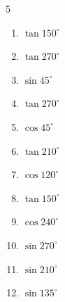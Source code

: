 \begin{multicols}{5}
\begin{enumerate}
  \item $\displaystyle \tan{150^\circ}$


\columnbreak %

\resetques

  \item $\displaystyle \tan{270^\circ}$

        \phantom{$\displaystyle なし$}

  \item $\displaystyle \sin{45^\circ}$


  \item $\displaystyle \tan{270^\circ}$

        \phantom{$\displaystyle なし$}

  \item $\displaystyle \cos{45^\circ}$


  \item $\displaystyle \tan{210^\circ}$


  \item $\displaystyle \cos{120^\circ}$


  \item $\displaystyle \tan{150^\circ}$


  \item $\displaystyle \cos{240^\circ}$


  \item $\displaystyle \sin{270^\circ}$

        \phantom{$\displaystyle =-1$}

  \item $\displaystyle \sin{210^\circ}$


  \item $\displaystyle \sin{135^\circ}$



\end{enumerate}
\end{multicols}
